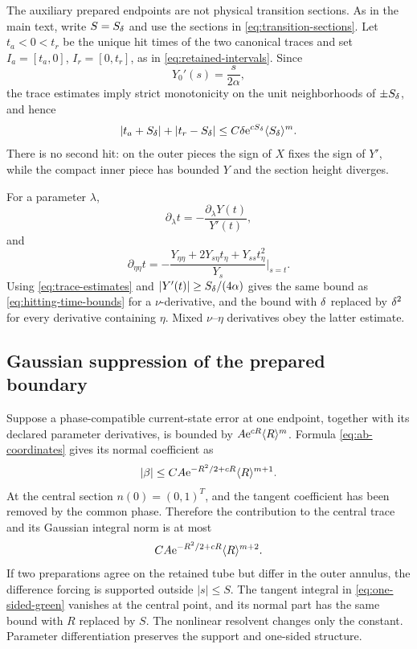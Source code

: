 The auxiliary prepared endpoints are not physical transition sections.
As in the main text, write \(S=S_\delta\) and use the sections in
\cref{eq:transition-sections}.  Let
\(t_a<0<t_r\) be the unique hit times of the two canonical traces and set
\(I_a=[t_a,0]\), \(I_r=[0,t_r]\), as in
\cref{eq:retained-intervals}.
Since
\[
 Y_0'(s)=\frac{s}{2\alpha},
\]
the trace estimates imply strict monotonicity on the unit neighborhoods of
\(\pm S_\delta\), and hence
\begin{equation}
\label{eq:hitting-time-bounds}
 |t_a+S_\delta|+|t_r-S_\delta|
 \le C\delta\mathrm e^{cS_\delta}\langle S_\delta\rangle^m.
\end{equation}
There is no second hit: on the outer pieces the sign of \(X\) fixes the
sign of \(Y'\), while the compact inner piece has bounded \(Y\) and the
section height diverges.

For a parameter \(\lambda\),
\[
 \partial_\lambda t
 =-\frac{\partial_\lambda Y(t)}{Y'(t)},
\]
and
\[
 \partial_{\eta\eta}t
 =-\frac{Y_{\eta\eta}+2Y_{s\eta}t_\eta+
                   Y_{ss}t_\eta^2}{Y_s}\bigg|_{s=t}.
\]
Using \cref{eq:trace-estimates} and
\(|Y'(t)|\ge S_\delta/(4\alpha)\) gives the same bound as
\cref{eq:hitting-time-bounds} for a \(\nu\)-derivative, and the bound with
\(\delta\) replaced by \(\delta^2\) for every derivative containing
\(\eta\).  Mixed \(\nu\)--\(\eta\) derivatives obey the latter estimate.

\subsection{Gaussian suppression of the prepared boundary}

Suppose a phase-compatible current-state error at one endpoint, together
with its declared parameter derivatives, is bounded by
\(A\mathrm e^{cR}\langle R\rangle^m\).  Formula
\cref{eq:ab-coordinates} gives its normal coefficient as
\[
 |\beta|\le
 CA\mathrm e^{-R^2/2+cR}\langle R\rangle^{m+1}.
\]
At the central section \(n(0)=(0,1)^T\), and the tangent coefficient has
been removed by the common phase.  Therefore the contribution to the
central trace and its Gaussian integral norm is at most
\begin{equation}
\label{eq:boundary-suppression}
 CA\mathrm e^{-R^2/2+cR}\langle R\rangle^{m+2}.
\end{equation}
If two preparations agree on the retained tube but differ in the outer
annulus, the difference forcing is supported outside \(|s|\le S\).  The
tangent integral in \cref{eq:one-sided-green} vanishes at the central point,
and its normal part has the same bound with \(R\) replaced by \(S\).
The nonlinear resolvent changes only the constant.  Parameter
differentiation preserves the support and one-sided structure.

